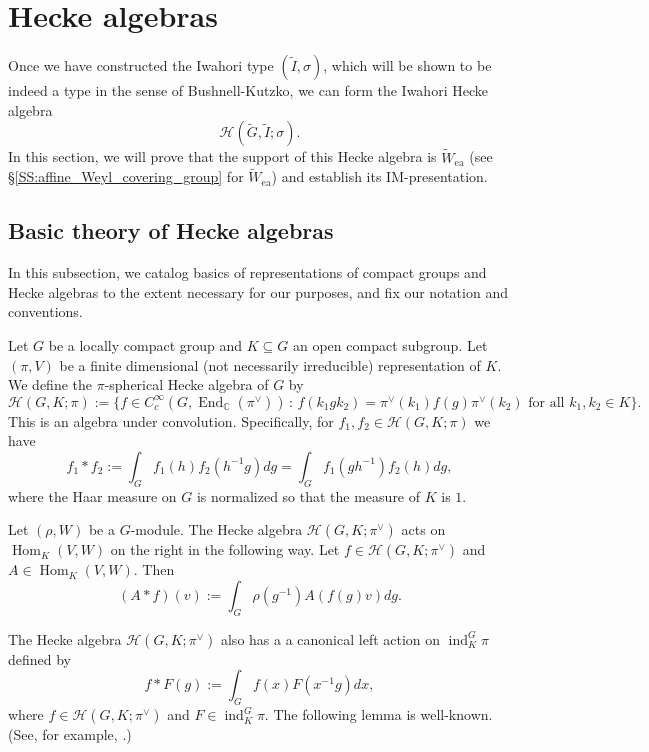 \documentclass[10pt, letterpaper]{amsart}
\theoremstyle{plain}
\theoremstyle{definition}
\numberwithin{equation}{section}
\newcommand{\C}{\mathbb{C}}
\newcommand{\Gt}{\widetilde{G}}
\newcommand{\It}{\widetilde{I}}
\newcommand{\Wt}{\widetilde{W}}
\newcommand{\ind}{\operatorname{ind}}
\newcommand{\End}{\operatorname{End}}
\newcommand{\Hom}{\operatorname{Hom}}
\newcommand{\ea}{\mathrm{ea}}
\newcommand{\Hcal}{\mathcal{H}}
\newcommand{\st}{\,:\,}
\begin{document}

\section{Hecke algebras}\label{S:Hecke}


Once we have constructed the Iwahori type $(\It, \sigma)$, which will be shown to be indeed a type in the sense of Bushnell-Kutzko, we can form the Iwahori Hecke algebra
\[
\Hcal(\Gt, \It; \sigma).
\]
In this section, we will prove that the support of this Hecke algebra is $\Wt_{\ea}$ (see \S \ref{SS:affine_Weyl_covering_group} for $\Wt_{\ea}$) and establish its IM-presentation. 

\subsection{Basic theory of Hecke algebras}\label{SS:HeckeReview}

In this subsection, we catalog basics of representations of compact groups and Hecke algebras to the extent necessary for our purposes, and fix our notation and conventions.

Let $G$ be a locally compact group and $K\subseteq G$ an open compact subgroup. Let $(\pi, V)$ be a finite dimensional (not necessarily irreducible) representation of $K$. We define the $\pi$-spherical Hecke algebra of $G$ by
\[
\Hcal(G, K; \pi):=\{f\in C_c^\infty(G, \End_{\C}(\pi^\vee))\st f(k_1gk_2)=\pi^\vee(k_1)f(g)\pi^\vee(k_2)\text{ for all $k_1, k_2\in K$}\}.
\]
This is an algebra under convolution. Specifically, for $f_{1},f_{2}\in \Hcal(G, K; \pi)$ we have
\begin{equation*}
	f_{1}*f_{2}:=\int_{G}f_{1}(h)f_{2}(h^{-1}g)dg=\int_{G}f_{1}(gh^{-1})f_{2}(h)dg,
\end{equation*}
where the Haar measure on $G$ is normalized so that the measure of $K$ is $1$.

Let $(\rho,W)$ be a $G$-module. The Hecke algebra $\Hcal(G, K; \pi^\vee)$ acts on $\Hom_{K}(V,W)$ on the right in the following way. Let $f\in \Hcal(G, K; \pi^\vee)$ and $A\in\Hom_{K}(V,W)$. Then
\begin{equation*}
	(A*f)(v):=\int_{G}\rho(g^{-1})A(f(g)v)dg.
\end{equation*}


The Hecke algebra $\Hcal(G, K; \pi^\vee)$ also has a a canonical left action on $\ind_{K}^{G}\pi$ defined by
    \begin{equation*}
        f*F(g):=\int_{G}f(x)F(x^{-1}g)dx,
    \end{equation*}
    where $f\in \Hcal(G, K; \pi^\vee)$ and $F\in \ind_{K}^{G}\pi$. The following lemma is well-known. (See, for example, \cite[(2.6)]{BK98}.)
\end{document}
